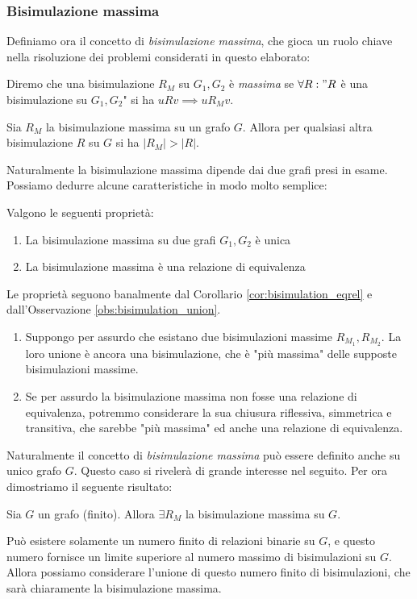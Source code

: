 \subsubsection{Bisimulazione massima}
\label{sec:bisi_max}
Definiamo ora il concetto di \emph{bisimulazione massima}, che gioca un ruolo chiave nella risoluzione dei problemi considerati in questo elaborato:
\begin{definition}
    Diremo che una bisimulazione $R_M$ su $G_1, G_2$ è \emph{massima} se $\forall R : "R$ è una bisimulazione su $G_1, G_2$" si ha $u R v \implies u R_M v$.
\end{definition}
\begin{observation}
    Sia $R_M$ la bisimulazione massima su un grafo $G$. Allora per qualsiasi altra bisimulazione $R$ su $G$ si ha $|R_M| > |R|$.
\end{observation}
Naturalmente la bisimulazione massima dipende dai due grafi presi in esame. Possiamo dedurre alcune caratteristiche in modo molto semplice:
\begin{proposition}
    Valgono le seguenti proprietà:
    \begin{enumerate}
        \item La bisimulazione massima su due grafi $G_1,G_2$ è unica
        \item La bisimulazione massima è una relazione di equivalenza
    \end{enumerate}
    \label{prop:bisi_max_equi}
\end{proposition}
\begin{proof2}
    Le proprietà seguono banalmente dal Corollario \ref*{cor:bisimulation_eqrel} e dall'Osservazione \ref*{obs:bisimulation_union}.
    \begin{enumerate}
        \item Suppongo per assurdo che esistano due bisimulazioni massime $R_{M_1}, R_{M_2}$. La loro unione è ancora una bisimulazione, che è "più massima" delle supposte bisimulazioni massime.
        \item Se per assurdo la bisimulazione massima non fosse una relazione di equivalenza, potremmo considerare la sua chiusura riflessiva, simmetrica e transitiva, che sarebbe "più massima" ed anche una relazione di equivalenza.
    \end{enumerate}
\end{proof2}
Naturalmente il concetto di \emph{bisimulazione massima} può essere definito anche su unico grafo $G$. Questo caso si rivelerà di grande interesse nel seguito. Per
ora dimostriamo il seguente risultato:
\begin{theorem}
    Sia $G$ un grafo (finito). Allora $\exists R_M$ la bisimulazione massima su $G$.
\end{theorem}
\begin{proof2}
    Può esistere solamente un numero finito di relazioni binarie su $G$, e questo numero fornisce un limite superiore al numero massimo di bisimulazioni su $G$.
    Allora possiamo considerare l'unione di questo numero finito di bisimulazioni, che sarà chiaramente la bisimulazione massima.
\end{proof2}

